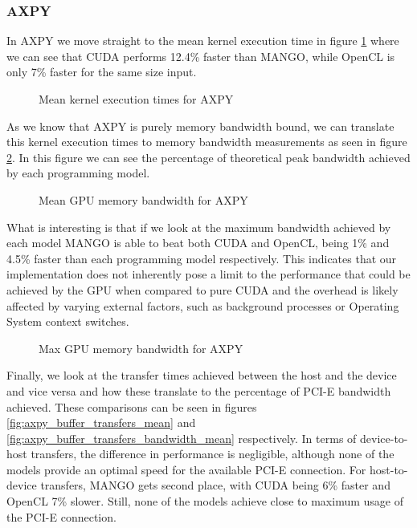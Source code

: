 \subsubsection{AXPY}

In AXPY we move straight to the mean kernel execution time in figure \ref{fig:axpy_kernel_executions_mean} where we can see that CUDA performs 12.4\% faster than MANGO, while OpenCL is only 7\% faster for the same size input.

\begin{figure}
    \centering
    \resizebox{!}{160pt}{
        
    }
    \captionsetup{justification=centering}
    \caption{Mean kernel execution times for AXPY}
    \label{fig:axpy_kernel_executions_mean}
\end{figure}

As we know that AXPY is purely memory bandwidth bound, we can translate this kernel execution times to memory bandwidth measurements as seen in figure \ref{fig:axpy_bandwidth_mean}. In this figure we can see the percentage of theoretical peak bandwidth achieved by each programming model.

\begin{figure}
    \centering
    \resizebox{!}{160pt}{
        
    }
    \captionsetup{justification=centering}
    \caption{Mean GPU memory bandwidth for AXPY}
    \label{fig:axpy_bandwidth_mean}
\end{figure}

What is interesting is that if we look at the maximum bandwidth achieved by each model MANGO is able to beat both CUDA and OpenCL, being 1\% and 4.5\% faster than each programming model respectively. This indicates that our implementation does not inherently pose a limit to the performance that could be achieved by the GPU when compared to pure CUDA and the overhead is likely affected by varying external factors, such as background processes or Operating System context switches. 

\begin{figure}
    \centering
    \resizebox{!}{160pt}{
        
    }
    \captionsetup{justification=centering}
    \caption{Max GPU memory bandwidth for AXPY}
    \label{fig:axpy_bandwidth_max}
\end{figure}

Finally, we look at the transfer times achieved between the host and the device and vice versa and how these translate to the percentage of PCI-E bandwidth achieved. These comparisons can be seen in figures \ref{fig:axpy_buffer_transfers_mean} and \ref{fig:axpy_buffer_transfers_bandwidth_mean} respectively. In terms of device-to-host transfers, the difference in performance is negligible, although none of the models provide an optimal speed for the available PCI-E connection. For host-to-device transfers, MANGO gets second place, with CUDA being 6\% faster and OpenCL 7\% slower. Still, none of the models achieve close to maximum usage of the PCI-E connection.

